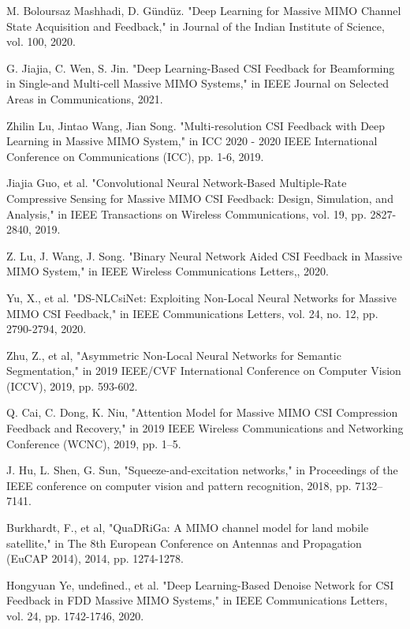 \documentclass[lettersize,journal]{IEEEtran}
\begin{document}
\begin{thebibliography}{00}
	M. Boloursaz Mashhadi, D. Gündüz. "Deep Learning for Massive MIMO Channel State Acquisition and Feedback," in Journal of the Indian Institute of Science, vol. 100, 2020.
	
	G. Jiajia, C. Wen, S. Jin. "Deep Learning-Based CSI Feedback for Beamforming in Single-and Multi-cell Massive MIMO Systems," in IEEE Journal on Selected Areas in Communications, 2021.
	
	Zhilin Lu, Jintao Wang, Jian Song. "Multi-resolution CSI Feedback with Deep Learning in Massive MIMO System," in ICC 2020 - 2020 IEEE International Conference on Communications (ICC), pp. 1-6, 2019.
	
	Jiajia Guo, et al. "Convolutional Neural Network-Based Multiple-Rate Compressive Sensing for Massive MIMO CSI Feedback: Design, Simulation, and Analysis," in IEEE Transactions on Wireless Communications, vol. 19, pp. 2827-2840, 2019.
	
	Z. Lu, J. Wang, J. Song. "Binary Neural Network Aided CSI Feedback in Massive MIMO System," in IEEE Wireless Communications Letters,, 2020.
	
	Yu, X., et al. "DS-NLCsiNet: Exploiting Non-Local Neural Networks for Massive MIMO CSI Feedback," in IEEE Communications Letters, vol. 24, no. 12, pp. 2790-2794, 2020.
	
	Zhu, Z., et al, "Asymmetric Non-Local Neural Networks for Semantic Segmentation," in 2019 IEEE/CVF International Conference on Computer Vision (ICCV), 2019, pp. 593-602.
	
	Q. Cai, C. Dong, K. Niu, "Attention Model for Massive MIMO CSI Compression Feedback and Recovery," in 2019 IEEE Wireless Communications and Networking Conference (WCNC), 2019, pp. 1–5.
	
	J. Hu, L. Shen, G. Sun, "Squeeze-and-excitation networks," in Proceedings of the IEEE conference on computer vision and pattern recognition, 2018, pp. 7132–7141.
	
	Burkhardt, F., et al, "QuaDRiGa: A MIMO channel model for land mobile satellite," in The 8th European Conference on Antennas and Propagation (EuCAP 2014), 2014, pp. 1274-1278.
	
	Hongyuan Ye, undefined., et al. "Deep Learning-Based Denoise Network for CSI Feedback in FDD Massive MIMO Systems," in IEEE Communications Letters, vol. 24, pp. 1742-1746, 2020.
	

\end{thebibliography}
\end{document}
